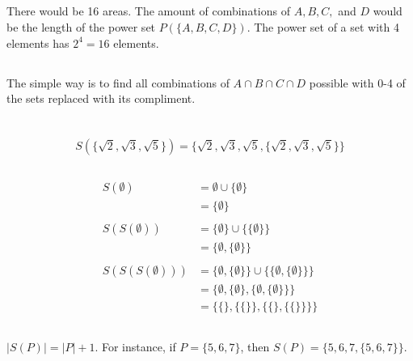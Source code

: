 \documentclass{article}
\begin{document}
\subsection{}
There would be 16 areas. The amount of combinations of $A, B, C,$ and $D$ would be the length of the power set $P ( \{ A, B, C, D \} )$. The power set of a set with 4 elements has $2^4 = 16$ elements.

\subsection{}
The simple way is to find all combinations of $A \cap B \cap C \cap D$ possible with 0-4 of the sets replaced with its compliment.

\section{}
\subsection{}
\begin{equation*}
    S(\{ \sqrt{2}, \sqrt{3}, \sqrt{5} \}) = 
    \{ \sqrt{2}, \sqrt{3}, \sqrt{5} , \{ \sqrt{2}, \sqrt{3}, \sqrt{5} \} \}
\end{equation*}

\subsection{}

\begin{align*}
    S(\emptyset ) & = \emptyset \cup \{ \emptyset \} \\
    & = \{ \emptyset \} \\ \\
    S(S(\emptyset)) &= \{ \emptyset \} \cup \{ \{ \emptyset \} \} \\
    &= \{ \emptyset, \{ \emptyset \} \} \\ \\
    S(S(S(\emptyset))) & = \{ \emptyset, \{ \emptyset \} \}  \cup \{ \{ \emptyset, \{ \emptyset \} \} \} \\
    & = \{ \emptyset , \{ \emptyset \} , \{ \emptyset , \{ \emptyset \} \} \} \\
    & = \{ \{ \} , \{ \{ \} \} , \{ \{ \} , \{ \{ \} \} \} \}
\end{align*}

\subsection{} 
$|S(P)| = |P| +1$. For instance, if $P = \{ 5, 6, 7 \}$, then $S(P) = \{ 5, 6, 7, \{ 5, 6, 7 \} \}$. 
\end{document}
